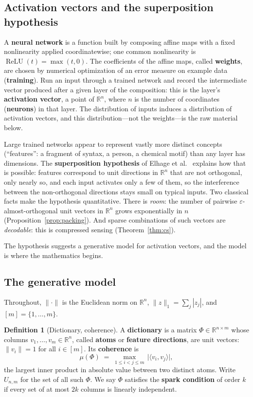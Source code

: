 \documentclass[11pt]{amsart}
\theoremstyle{plain}
\theoremstyle{definition}
\newtheorem{definition}[theorem]{Definition}
\newcommand{\R}{\mathbb{R}}
\DeclareMathOperator{\relu}{ReLU}
\begin{document}
\subsection{Activation vectors and the superposition hypothesis}

A \textbf{neural network} is a function built by composing affine maps with a fixed nonlinearity applied coordinatewise; one common nonlinearity is $\relu(t)=\max(t,0)$. The coefficients of the affine maps, called \textbf{weights}, are chosen by numerical optimization of an error measure on example data (\textbf{training}). Run an input through a trained network and record the intermediate vector produced after a given layer of the composition: this is the layer's \textbf{activation vector}, a point of $\R^n$, where $n$ is the number of coordinates (\textbf{neurons}) in that layer. The distribution of inputs induces a distribution of activation vectors, and this distribution---not the weights---is the raw material below.

Large trained networks appear to represent vastly more distinct concepts (``features'': a fragment of syntax, a person, a chemical motif) than any layer has dimensions. The \textbf{superposition hypothesis} of Elhage et al.~\cite{elhage2022} explains how that is possible: features correspond to unit directions in $\R^n$ that are not orthogonal, only nearly so, and each input activates only a few of them, so the interference between the non-orthogonal directions stays small on typical inputs. Two classical facts make the hypothesis quantitative. There is \emph{room}: the number of pairwise $\varepsilon$-almost-orthogonal unit vectors in $\R^n$ grows exponentially in $n$ (Proposition~\ref{prop:packing}). And sparse combinations of such vectors are \emph{decodable}: this is compressed sensing (Theorem~\ref{thm:cs}).

The hypothesis suggests a generative model for activation vectors, and the model is where the mathematics begins.

\subsection{The generative model}

Throughout, $\|\cdot\|$ is the Euclidean norm on $\R^n$, $\|z\|_1=\sum_j |z_j|$, and $[m]=\{1,\dots,m\}$.

\begin{definition}[Dictionary, coherence]\label{def:coherence}
A \textbf{dictionary} is a matrix $\Phi\in\R^{n\times m}$ whose columns $v_1,\dots,v_m\in\R^n$, called \textbf{atoms} or \textbf{feature directions}, are unit vectors: $\|v_i\|=1$ for all $i\in[m]$. Its \textbf{coherence} is
\[
  \mu(\Phi)\;=\;\max_{1\le i<j\le m}\,\lvert\langle v_i,v_j\rangle\rvert,
\]
the largest inner product in absolute value between two distinct atoms. Write $U_{n,m}$ for the set of all such $\Phi$. We say $\Phi$ satisfies the \textbf{spark condition} of order $k$ if every set of at most $2k$ columns is linearly independent.
\end{definition}
\end{document}
